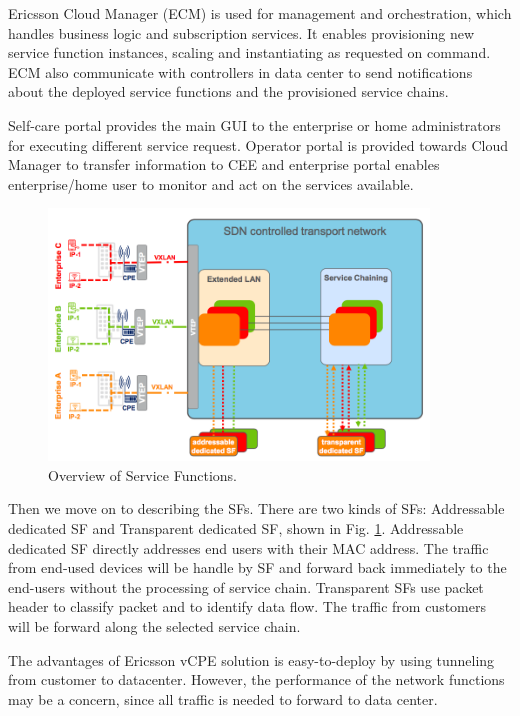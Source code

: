 Ericsson Cloud Manager (ECM) is used for management and orchestration, which handles business logic and subscription services.
It enables provisioning new service function instances, scaling and instantiating as requested on command.
ECM also communicate with controllers in data center to send notifications about the deployed service functions and the provisioned service chains.

Self-care portal provides the main GUI to the enterprise or home administrators for executing different service request.
Operator portal is provided towards Cloud Manager to transfer information to CEE and enterprise portal enables enterprise/home user to monitor and act on the services available.


\begin{figure}[!t]
\centering
\includegraphics[width=0.9\textwidth]{./fig/ericsson_sf.png}
\caption{Overview of Service Functions.\cite{ericsson-vcpe}}
\label{fig:ericsson_sf}
\end{figure}

Then we move on to describing the SFs. There are two kinds of SFs: Addressable dedicated SF and Transparent dedicated SF, shown in Fig. \ref{fig:ericsson_sf}.
Addressable dedicated SF directly addresses end users with their MAC address.
The traffic from end-used devices will be handle by SF and forward back immediately to the end-users without the processing of service chain.
Transparent SFs use packet header to classify packet and to identify data flow.
The traffic from customers will be forward along the selected service chain.

The advantages of Ericsson vCPE solution is easy-to-deploy by using tunneling from customer to datacenter.
However, the performance of the network functions may be a concern, since all traffic is needed to forward to data center.



